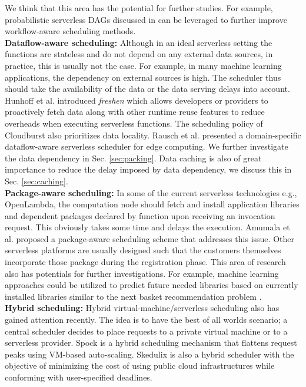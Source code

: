 We think that this area has the potential for further studies. For example, probabilistic serverless DAGs discussed in  can be leveraged to further improve workflow-aware scheduling methods.
\\
\noindent \textbf{Dataflow-aware scheduling:}
Although in an ideal serverless setting the functions are stateless and do not depend on any external data sources, in practice, this is usually not the case. For example, in many machine learning applications, the dependency on external sources is high.  The scheduler thus should take the availability of the data or the data serving delays into account. Hunhoff et al.  introduced \textit{freshen} which allows developers or providers to proactively fetch data along with other runtime reuse features to reduce overheads when executing serverless functions. The scheduling policy of Cloudburst  also prioritizes data locality. Rausch et al.  presented a domain-specific dataflow-aware serverless scheduler for edge computing.  
We further investigate the data dependency in Sec. \ref{sec:packing}. Data caching is also of great importance to reduce the delay imposed by data dependency, we discuss this in Sec. \ref{sec:caching}.
\\
\noindent \textbf{Package-aware scheduling:}
In some of the current serverless technologies e.g., OpenLambda, the computation node should fetch and install application libraries and dependent packages declared by function upon receiving an invocation request. This obviously takes some time and delays the execution. Amumala et al.  proposed a package-aware scheduling scheme that addresses this issue. Other serverless platforms are usually designed such that the customers themselves incorporate those package during the registration phase. 
This area of research also has potentials for further investigations. For example, machine learning approaches could be utilized to predict future needed libraries based on currently installed libraries similar to the next basket recommendation problem .
\\
\noindent \textbf{Hybrid scheduling:}
Hybrid virtual-machine/serverless scheduling also has gained attention recently. The idea is to have the best of all worlds scenario; a central scheduler decides to place requests to a private virtual machine or to a serverless provider. Spock  is a hybrid scheduling mechanism that flattens request peaks using VM-based auto-scaling. Skedulix  is also a hybrid scheduler with the objective of minimizing the cost of using public cloud infrastructures while conforming with user-specified deadlines.

